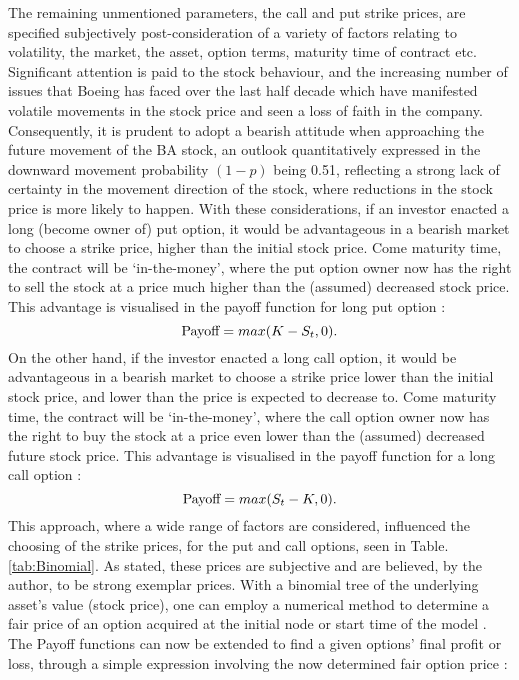 \documentclass[
	a4paper, %
	11pt, %
	twoside, %
]{LTJournalArticle}
\begin{document}
\noindent The remaining unmentioned parameters, the call and put strike prices, are specified subjectively post-consideration of a variety of factors relating to volatility, the market, the asset, option terms, maturity time of contract etc.
Significant attention is paid to the stock behaviour, and the increasing number of issues that Boeing has faced over the last half decade which have manifested volatile movements in the stock price and seen a loss of faith in the company. 
Consequently, it is prudent to adopt a bearish attitude when approaching the future movement of the BA stock, an outlook quantitatively expressed in the downward movement probability $(1-p)$ being 0.51, reflecting a strong lack of certainty in the movement direction of the stock, where reductions in the stock price is more likely to happen.
With these considerations, if an investor enacted a long (become owner of) put option, it would be advantageous in a bearish market to choose a strike price, higher than the initial stock price.
Come maturity time, the contract will be `in-the-money', where the put option owner now has the right to sell the stock at a price much higher than the (assumed) decreased stock price.
This advantage is visualised in the payoff function for long put option \cite{Options}: 
\begin{equation}
	\textnormal{Payoff} = max(K-S_{t},0).
\end{equation}
On the other hand, if the investor enacted a long call option, it would be advantageous in a bearish market to choose a strike price lower than the initial stock price, and lower than the price is expected to decrease to.
Come maturity time, the contract will be `in-the-money', where the call option owner now has the right to buy the stock at a price even lower than the (assumed) decreased future stock price.
This advantage is visualised in the payoff function for a long call option \cite{Options}:
\begin{equation}
	\textnormal{Payoff} = max(S_{t}-K,0).
\end{equation}
This approach, where a wide range of factors are considered, influenced the choosing of the strike prices, for the put and call options, seen in Table. \ref{tab:Binomial}.
As stated, these prices are subjective and are believed, by the author, to be strong exemplar prices.
With a binomial tree of the underlying asset's value (stock price), one can employ a numerical method to determine a fair price of an option acquired at the initial node or start time of the model \cite{Lec_Bi}.
The Payoff functions can now be extended to find a given options' final profit or loss, through a simple expression involving the now determined fair option price \cite{Options}:
\end{document}
